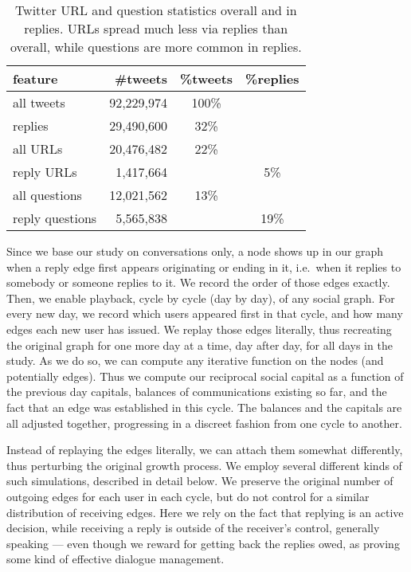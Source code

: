 \documentclass[10pt,oneside]{memoir}
\begin{document}
\begin{table}
\begin{tabular}{|lrcc|}
\toprule
feature & \#tweets & \%tweets & \%replies \\
\midrule
all tweets & 92,229,974 & 100\% & \space\\
replies & 29,490,600 & 32\% & \space \\
all URLs & 20,476,482 &  22\% & \space \\
reply URLs & 1,417,664 & \space & 5\% \\
all questions & 12,021,562 & 13\% & \space \\
reply questions & 5,565,838 & \space & 19\% \\
\bottomrule
\end{tabular}
\label{table:reply-stats}
\caption{Twitter URL and question statistics overall and in replies.  URLs spread much less via replies than overall, while questions are more common in replies.}
\end{table}
Since we base our study on conversations only, a node shows up in our graph when a reply edge first appears originating or ending in it, i.e.\ when it replies to somebody or someone replies to it.  We record the order of those edges exactly.
Then, we enable playback, cycle by cycle (day by day), of any social graph.  For every new day, we record which users appeared first in that cycle, and how many edges each new user has issued.
We replay those edges literally, thus recreating the original graph for one more day at a time, day after day, for all days in the study.  As we do so, we can compute any iterative function on the nodes (and potentially edges).  Thus we compute our reciprocal social capital as a function of the previous day capitals, balances of communications existing so far, and the fact that an edge was established in this cycle.  The balances and the capitals are all adjusted together, progressing in a discreet fashion from one cycle to another.


Instead of replaying the edges literally, we can attach them somewhat differently, thus perturbing the original growth process.  We employ several different kinds of such simulations, described in detail below.  We preserve the original number of outgoing edges for each user in each cycle, but do not control for a similar distribution of receiving edges.  Here we rely on the fact that replying is an active decision, while receiving a reply is outside of the receiver's control, generally speaking --- even though we reward for getting back the replies owed, as proving some kind of effective dialogue management.
\end{document}
